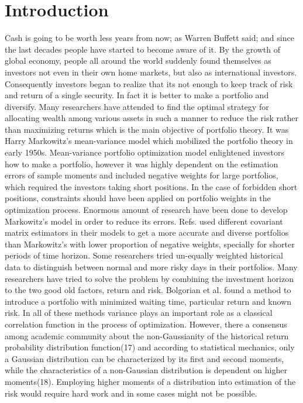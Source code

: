\documentclass[ aip,jmp,reprint]{revtex4-2}
\begin{document}
\section{Introduction}
Cash is going to be worth less years from now; as Warren Buffett said; 
and since the last decades people have started to become aware of it. 
By the growth of global economy, people all around the world suddenly found themselves as investors 
not even in their own home markets, but also as international investors. 
Consequently investors began to realize that its not enough to keep track of risk and return of 
a single security. In fact it is better to make a portfolio and diversify. 
Many researchers have attended to find the optimal strategy for allocating wealth among various assets in such a manner to reduce the risk rather than maximizing returns which is the main objective of portfolio theory\cite{Jorion}. It was Harry Markowitz's mean-variance model\cite{Mark1}\cite{Mark2} which mobilized the portfolio theory in early 1950s. 
Mean-variance portfolio optimization model enlightened investors how to make a portfolio, however it was highly dependent on the estimation errors of sample moments and included negative weights for large portfolios, which required the investors taking short positions. In the case of forbidden short positions, constraints should have been applied on portfolio weights in the optimization process\cite{Best}\cite{Green}\cite{Jagannathan}.   
Enormous amount of research have been done to develop Markowitz's model in order to reduce its errors. Refs. \cite{Ledoit}\cite{Laloux}\cite{Plerou}\cite{Rosenow}\cite{Potters}\cite{Anderberg} used different covariant matrix estimators in their models to get a more accurate and diverse portfolios than Markowitz's with lower proportion of negative weights, specially for shorter periods of time horizon\cite{Kondor}\cite{Pafka}\cite{Kondor2}.
Some researchers tried un-equally weighted historical data to distinguish between normal and more risky days in their portfolios\cite{Coelho}.  
Many researchers have tried to solve the problem by combining the investment horizon 
to the two good old factors, return and risk. Bolgorian et al.\cite{Bolgorian} found a method to introduce a portfolio with minimized waiting time, particular return and known risk. In all of these methods variance plays an important role as a classical correlation function in the process of optimization. However, there a consensus among academic community about the non-Gaussianity of the historical return probability distribution function(17) and according to statistical mechanics, only a Gaussian distribution can be characterized by its first and second moments, while the characteristics of a non-Gaussian distribution is dependent on higher moments(18). Employing higher moments of a distribution into estimation of the risk would require hard work and in some cases might not be possible.  
\end{document}
